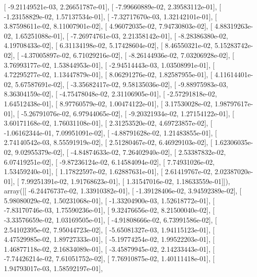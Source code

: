 \documentclass{article}
\begin{document}
       [ -9.21149521e-03,   2.26651787e-01],
       [ -7.99660889e-02,   2.39583112e-01],
       [ -1.23158829e-02,   1.57137534e-01],
       [ -7.32717670e-03,   1.32142101e-01],
       [  3.87598611e-02,   8.11007901e-02],
       [  4.96072035e-02,   7.94730803e-02],
       [  4.88319263e-02,   1.65251088e-01],
       [ -7.26974761e-03,   2.21358142e-01],
       [ -8.28386380e-02,   4.19708433e-02],
       [  6.31134198e-02,   5.17428604e-02],
       [  8.46550321e-02,   5.15283742e-02],
       [ -4.37005897e-02,   6.71029216e-02],
       [ -8.26144936e-02,   7.03206928e-02],
       [  3.76993177e-02,   1.53844953e-01],
       [ -2.94514443e-03,   1.03508991e-01],
       [  4.72295277e-02,   1.13447879e-01],
       [  8.06291276e-02,   1.82587955e-01],
       [  4.11614401e-02,   5.67587691e-02],
       [ -3.35682417e-02,   9.58135036e-02],
       [ -9.88975983e-03,   8.36304159e-02],
       [ -4.75478048e-02,   2.31106905e-01],
       [ -2.57291818e-02,   1.64512438e-01],
       [  8.97760579e-02,   1.00474122e-01],
       [  3.17530028e-02,   1.98797617e-01],
       [ -5.26791076e-02,   6.97944065e-02],
       [ -9.20321934e-02,   1.27154122e-01],
       [  3.60171168e-02,   1.76031108e-01],
       [  2.31253520e-02,   4.69723857e-02],
       [ -1.06162344e-01,   7.09951091e-02],
       [ -4.88791628e-02,   1.21483855e-01],
       [  2.74140542e-03,   8.55591919e-02],
       [  2.51280467e-02,   6.46929103e-02],
       [  1.62306035e-02,   9.02955379e-02],
       [ -4.84874633e-02,   7.26402940e-02],
       [  2.53387832e-02,   6.07419251e-02],
       [ -9.87236124e-02,   6.14584094e-02],
       [  7.74931026e-02,   1.53459240e-01],
       [  1.17822597e-02,   1.62887631e-01],
       [  2.61419767e-02,   2.02387020e-01],
       [  7.99251391e-02,   1.91768623e-01],
       [  1.31547016e-02,   1.18633559e-01]]), array([[ -6.24476737e-02,   1.33910382e-01],
       [ -1.39128406e-02,   3.94592389e-02],
       [  5.98080029e-02,   1.50231068e-01],
       [ -1.33204900e-03,   1.52618772e-01],
       [ -7.83170746e-03,   1.75590236e-01],
       [  9.32476656e-02,   8.21500040e-02],
       [ -3.33576659e-02,   1.03169505e-01],
       [ -4.91808666e-02,   6.73991586e-02],
       [  2.54102395e-02,   7.95044723e-02],
       [ -5.65081327e-03,   1.94115123e-01],
       [  4.47529985e-02,   1.89727333e-01],
       [ -5.19774254e-02,   1.99522203e-01],
       [  1.46877118e-02,   2.16834089e-01],
       [ -3.45879945e-02,   2.14233443e-01],
       [ -7.74426214e-02,   7.61051752e-02],
       [  7.76910875e-02,   1.40111418e-01],
       [  1.94793017e-03,   1.58592197e-01],
\end{document}
